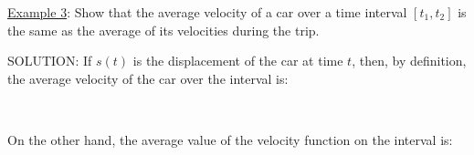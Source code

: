 \documentclass[paper=a4, fontsize=11pt]{scrartcl} %
\numberwithin{equation}{section} %
\numberwithin{figure}{section} %
\numberwithin{table}{section} %
\begin{document}
\underline{Example 3}: Show that the average velocity of a car over a time interval $[t_1,t_2]$ is the same as the average of its velocities during the trip.\\
\indent

SOLUTION: If $s(t)$ is the displacement of the car at time $t$, then, by definition, the average velocity of the car over the interval is:\\
\indent

\[\text{ }\]
\indent\\
\indent

On the other hand, the average value of the velocity function on the interval is:

\vspace{1.5in}



\end{document}

